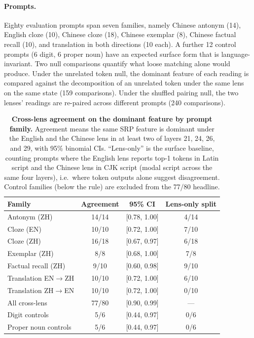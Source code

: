 \paragraph{Prompts.}
Eighty evaluation prompts span seven families, namely Chinese antonym (14),
English cloze (10), Chinese cloze (18), Chinese exemplar (8), Chinese
factual recall (10), and translation in both directions (10 each). A
further 12 control prompts (6 digit, 6 proper noun) have an expected
surface form that is language-invariant. Two null comparisons quantify
what loose matching alone would produce. Under the unrelated token null, the dominant
feature of each reading is compared against the decomposition of an unrelated
token under the same lens on the same state (159 comparisons). Under the shuffled pairing
null, the two lenses' readings are re-paired across different prompts
(240 comparisons).

\begin{table}[!tbp]
\caption{\textbf{Cross-lens agreement on the dominant feature by prompt
family.} Agreement means the same SRP feature is dominant under the English and
the Chinese lens in at least two of layers 21, 24, 26, and 29, with 95\%
binomial CIs.
``Lens-only'' is the surface baseline, counting prompts where the English lens
reports top-1 tokens in Latin script and the Chinese lens in CJK script
(modal script across the same four layers), i.e.\ where token outputs
alone suggest disagreement.
Control families (below the rule) are excluded from the 77/80 headline.}
\label{tab:app-cross-lens-families}
\centering
\scriptsize
\setlength{\tabcolsep}{4.5pt}
\renewcommand{\arraystretch}{1.08}
\begin{tabularx}{\linewidth}{@{}>{\RaggedRight\arraybackslash}Xccc@{}}
\toprule
Family & Agreement & 95\% CI & Lens-only split \\
\midrule
Antonym (ZH) & 14/14 & [0.78, 1.00] & 4/14 \\
Cloze (EN) & 10/10 & [0.72, 1.00] & 7/10 \\
Cloze (ZH) & 16/18 & [0.67, 0.97] & 6/18 \\
Exemplar (ZH) & 8/8 & [0.68, 1.00] & 7/8 \\
Factual recall (ZH) & 9/10 & [0.60, 0.98] & 9/10 \\
Translation EN\(\to\)ZH & 10/10 & [0.72, 1.00] & 6/10 \\
Translation ZH\(\to\)EN & 10/10 & [0.72, 1.00] & 0/10 \\
\midrule
All cross-lens & 77/80 & [0.90, 0.99] & --- \\
\midrule
Digit controls & 5/6 & [0.44, 0.97] & 0/6 \\
Proper noun controls & 5/6 & [0.44, 0.97] & 0/6 \\
\bottomrule
\end{tabularx}
\end{table}

